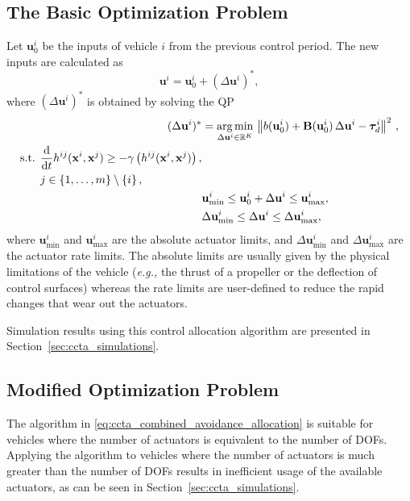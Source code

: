\subsection{The Basic Optimization Problem}
Let $\mathbf{u}_0^{i}$ be the inputs of vehicle $i$ from the previous control period.
The new inputs are calculated as
\begin{equation}
    \mathbf{u}^{i} = \mathbf{u}_0^{i} + (\Delta\mathbf{u}^{i})^*,
\end{equation}
where $(\Delta\mathbf{u}^{i})^*$ is obtained by solving the QP
\begin{subequations}
    \begin{align}
        (\Delta\mathbf{u}^{i})^* &= \operatorname*{arg\,min}_{\Delta\mathbf{u}^{i}\in\mathbb{R}^{K}}\,\left\| b(\mathbf{u}_0^{i}) + \mathbf{B}(\mathbf{u}_0^{i})\,\Delta\mathbf{u}^{i} - \bm{\tau}_d^{i} \right\|^2\,, \label{eq:ccta_combined_avoidance_allocation_criterion} \\
        \begin{split}
            \text{s.t. }& \frac{{\rm d}}{{\rm d}t}h^{ij}(\mathbf{x}^{i}, \mathbf{x}^{j}) \geq - \gamma\left(h^{ij}(\mathbf{x}^{i}, \mathbf{x}^{j})\right), \\
            & j \in \left\{ 1, \ldots, m \right\} \setminus \left\{ i \right\},
        \end{split} \label{eq:ccta_combined_avoidance_allocation_constraint} \\
        & \mathbf{u}^{i}_{\min} \leq \mathbf{u}_0^{i} + \Delta\mathbf{u}^{i} \leq \mathbf{u}^{i}_{\max}, \\
        & \Delta\mathbf{u}^{i}_{\min} \leq \Delta\mathbf{u}^{i} \leq \Delta\mathbf{u}^{i}_{\max}, \label{eq:ccta_combined_avoidance_allocation_delta_u}
    \end{align}
    \label{eq:ccta_combined_avoidance_allocation}
\end{subequations}
\noindent where $\mathbf{u}^{i}_{\min}$ and $\mathbf{u}^{i}_{\max}$ are the absolute actuator limits, and $\Delta\mathbf{u}^{i}_{\min}$ and $\Delta\mathbf{u}^{i}_{\max}$ are the actuator rate limits.
The absolute limits are usually given by the physical limitations of the vehicle (\emph{e.g.,} the thrust of a propeller or the deflection of control surfaces) whereas the rate limits are user-defined to reduce the rapid changes that wear out the actuators.

Simulation results using this control allocation algorithm are presented in Section~\ref{sec:ccta_simulations}.

\subsection{Modified Optimization Problem}
The algorithm in \eqref{eq:ccta_combined_avoidance_allocation} is suitable for vehicles where the number of actuators is equivalent to the number of DOFs.
Applying the algorithm to vehicles where the number of actuators is much greater than the number of DOFs results in inefficient usage of the available actuators, as can be seen in Section~\ref{sec:ccta_simulations}.

